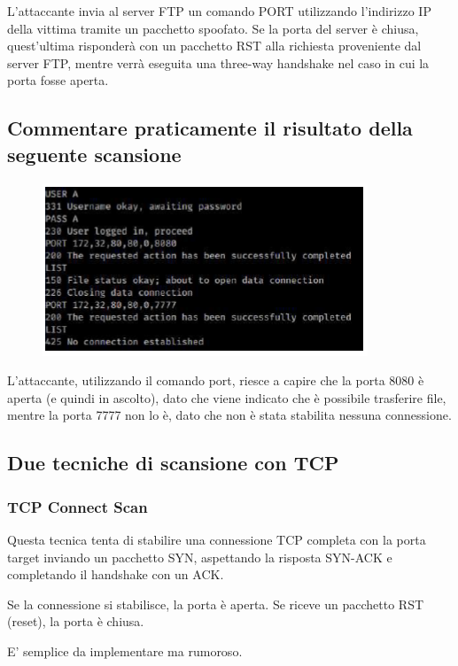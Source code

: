 \documentclass{report}
\begin{document}
\noindent L'attaccante invia al server FTP un comando PORT utilizzando l'indirizzo IP della vittima tramite un pacchetto spoofato.
Se la porta del server è chiusa, quest'ultima risponderà con un pacchetto RST alla richiesta proveniente dal server FTP, mentre verrà eseguita una three-way handshake nel caso in cui la porta fosse aperta.


\subsection{Commentare praticamente il risultato della seguente scansione}

\begin{figure}[H]
    \centering
    \includegraphics[width=1\linewidth]{images/scansione.png}
\end{figure}
L'attaccante, utilizzando il comando port, riesce a capire che la porta 8080 è aperta (e quindi in ascolto), dato che viene indicato che è possibile trasferire file, mentre la porta 7777 non lo è, dato che non è stata stabilita nessuna connessione.

\subsection{Due tecniche di scansione con TCP}
\subsubsection{TCP Connect Scan}
Questa tecnica tenta di stabilire una connessione TCP completa con la porta target inviando un pacchetto SYN, aspettando la risposta SYN-ACK e completando il handshake con un ACK.

\noindent Se la connessione si stabilisce, la porta è aperta.
Se riceve un pacchetto RST (reset), la porta è chiusa.

\noindent E' semplice da implementare ma rumoroso.
\end{document}
